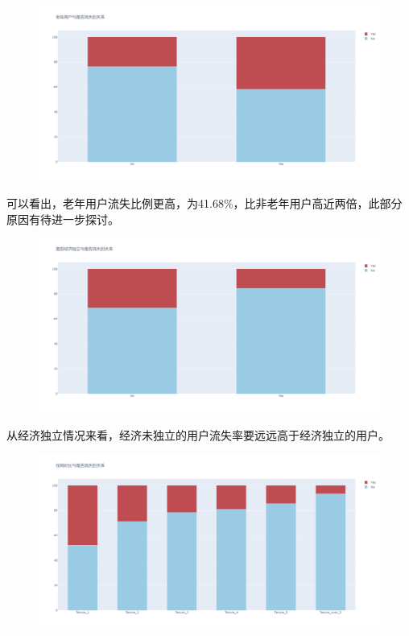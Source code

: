 \documentclass{article}
\begin{document}
\begin{figure}[H]
	\centering
	\includegraphics[width=\textwidth]{./img/t3.png}
\end{figure}
可以看出，老年用户流失比例更高，为41.68\%，比非老年用户高近两倍，此部分原因有待进一步探讨。
\begin{figure}[H]
	\centering
	\includegraphics[width=\textwidth]{./img/t4.png}
\end{figure}
从经济独立情况来看，经济未独立的用户流失率要远远高于经济独立的用户。
\begin{figure}[H]
	\centering
	\includegraphics[width=\textwidth]{./img/t5.png}
\end{figure}
\end{document}
